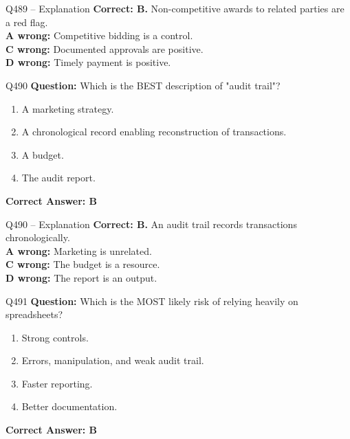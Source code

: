 \documentclass[aspectratio=169,10pt]{beamer}
\begin{document}
	\begin{frame}[t]{Q489 -- Explanation}
		\small
		\textbf{Correct: B.} Non-competitive awards to related parties are a red flag. \\[4pt]
		\textbf{A wrong:} Competitive bidding is a control. \\[2pt]
		\textbf{C wrong:} Documented approvals are positive. \\[2pt]
		\textbf{D wrong:} Timely payment is positive.
	\end{frame}
	
	\begin{frame}[t]{Q490}
		\small
		\textbf{Question:} Which is the BEST description of "audit trail"?
		\begin{enumerate}[label=\Alph*.,itemsep=1pt,topsep=2pt]
			\item A marketing strategy.
			\item A chronological record enabling reconstruction of transactions.
			\item A budget.
			\item The audit report.
		\end{enumerate}
		\vspace{4pt}
		\textbf{Correct Answer: B}
	\end{frame}
	
	\begin{frame}[t]{Q490 -- Explanation}
		\small
		\textbf{Correct: B.} An audit trail records transactions chronologically. \\[4pt]
		\textbf{A wrong:} Marketing is unrelated. \\[2pt]
		\textbf{C wrong:} The budget is a resource. \\[2pt]
		\textbf{D wrong:} The report is an output.
	\end{frame}
	
	\begin{frame}[t]{Q491}
		\small
		\textbf{Question:} Which is the MOST likely risk of relying heavily on spreadsheets?
		\begin{enumerate}[label=\Alph*.,itemsep=1pt,topsep=2pt]
			\item Strong controls.
			\item Errors, manipulation, and weak audit trail.
			\item Faster reporting.
			\item Better documentation.
		\end{enumerate}
		\vspace{4pt}
		\textbf{Correct Answer: B}
	\end{frame}
	
\end{document}
